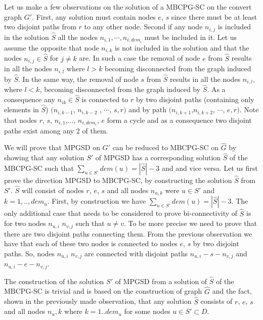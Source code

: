 Let us make a few observations on the solution of a MBCPG-SC on the convert graph $G'$. First, any solution must contain nodes $e$, $s$ since there must be at least two disjoint paths from $r$ to any other node. Second if any node $n_{i,j}$ is included in the solution $\hat{S}$ all the nodes $n_{i,1}, \cdots , n_{i,dem_i}$ must be included in it. Let us assume the opposite that node $n_{i,k}$ is not included in the solution and that  the nodes $n_{i,j} \in \hat{S}$ for $j\neq k$ are. In such a case the removal of node $e$ from  $\hat{S}$ results in all the nodes $n_{i,l}$ where $l>k$  becoming disconnected from  the graph induced by $\hat{S}$. In the same way, the removal of node $s$ from  $\hat{S}$ results in all the nodes $n_{i,l}$, where $l<k$, becoming disconnected from the graph induced by $\hat{S}$.  As a consequence any $n_{ik} \in\hat{S}$ is connected to $r$ by two disjoint paths (containing only elements in $\hat{S}$)  $(n_{i,k-1}$, $ n_{i,k-2}$ , $\cdots$, $s,r)$ and by path $(n_{i,k+1}$,$n_{i,k+2}$, $\cdots$, $e,r)$. Note that nodes $r$, $s$, $n_{i,1}$,...,  $n_{i,dem_i}$, $e$ form a cycle and as a consequence two disjoint paths exist among any 2 of them.


We will prove that MPGSD on $G'$ can be reduced to MBCPG-SC on $\hat{G}$ by showing that any solution $S'$ of MPGSD has a corresponding solution $\hat{S}$ of the MBCPG-SC such that $\sum_{u \in S'}
 dem(u) = |\hat{S}|-3$ and and vice versa. Let us first prove  the direction MPGSD to MBCPG-SC, by constructing the solution $\hat{S}$ from $S'$.  $\hat{S}$ will consist of nodes $r$, $e$, $s$  and all nodes $n_{u,k}$ were $u \in S'$ and $k=1,.., dem_u$. First, by construction we have  $\sum_{u \in S'} dem(u) = |\hat{S}|-3$.  The only additional case that needs to be considered to prove bi-connectivity of $\hat{S}$  is for two nodes $n_{u,i}$ $n_{v,j}$ such that $u \neq v$. To be more precise we need to prove that there are two disjoint paths connecting them.   From the previous observation we have that each of these two nodes is connected to nodes $e$, $s$  by two disjoint paths. So, nodes $n_{u,i}$ $n_{v,j}$ are connected with disjoint paths $n_{u,i}-s-n_{v,j}$ and $n_{u,i}-e-n_{v,j}$. 

The construction of the solution $S'$ of MPGSD from a solution of $\hat{S}$ of the MBCPG-SC is trivial and is based on the construction of graph $\hat{G}$ and the fact, shown in the previously made observation,  that any solution  $\hat{S}$ consists of $r$, $e$, $s$  and all nodes $n_u,k$  where $k = 1..dem_u$ for some nodes $u \in S' \subset D$.





